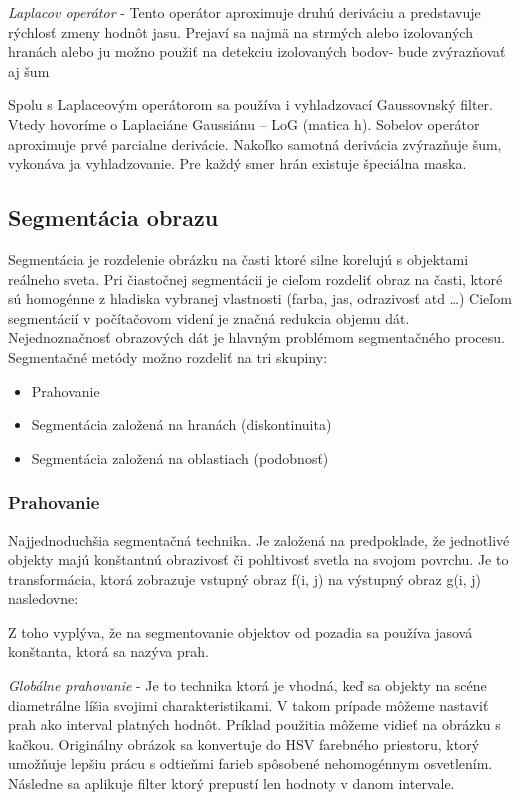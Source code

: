 \textit{Laplacov operátor} - Tento operátor aproximuje druhú deriváciu a predstavuje rýchlosť zmeny hodnôt jasu. Prejaví sa najmä na strmých alebo izolovaných hranách alebo ju možno použiť na detekciu izolovaných bodov- bude zvýrazňovať aj šum


Spolu s Laplaceovým operátorom sa používa i vyhladzovací Gaussovnský filter. Vtedy hovoríme o Laplaciáne Gaussiánu – LoG (matica h).
Sobelov operátor aproximuje prvé parcialne derivácie. Nakoľko samotná derivácia zvýrazňuje šum, vykonáva ja vyhladzovanie. Pre každý smer hrán existuje špeciálna maska.


\subsection{Segmentácia obrazu}
Segmentácia je rozdelenie obrázku na časti ktoré silne korelujú s objektami reálneho sveta. Pri čiastočnej segmentácii je cieľom rozdeliť obraz na časti, ktoré sú homogénne z hladiska vybranej vlastnosti (farba, jas, odrazivosť atd …) Cieľom segmentácií v počítačovom videní je značná redukcia objemu dát. Nejednoznačnosť obrazových dát je hlavným problémom segmentačného procesu. Segmentačné metódy možno rozdeliť na tri skupiny: 


\begin{itemize}
\item Prahovanie
\item Segmentácia založená na hranách (diskontinuita)
\item Segmentácia založená na oblastiach (podobnosť)
\end{itemize}

\subsubsection{Prahovanie}
Najjednoduchšia segmentačná technika. Je založená na predpoklade, že jednotlivé objekty majú konštantnú obrazivosť či pohltivosť svetla na svojom povrchu. Je to transformácia, ktorá zobrazuje vstupný obraz f(i, j) na výstupný obraz g(i, j) nasledovne: 



Z toho vyplýva, že na segmentovanie objektov od pozadia sa používa jasová konštanta, ktorá sa nazýva prah. 


\textit{Globálne prahovanie} - Je to technika ktorá je vhodná, keď sa objekty na scéne diametrálne líšia svojimi charakteristikami. V takom prípade môžeme nastaviť prah ako interval platných hodnôt. Príklad použitia môžeme vidieť na obrázku s kačkou. Originálny obrázok sa konvertuje do HSV farebného priestoru, ktorý umožňuje lepšiu prácu s odtieňmi farieb spôsobené nehomogénnym osvetlením. Následne sa aplikuje filter ktorý prepustí len hodnoty v danom intervale.

